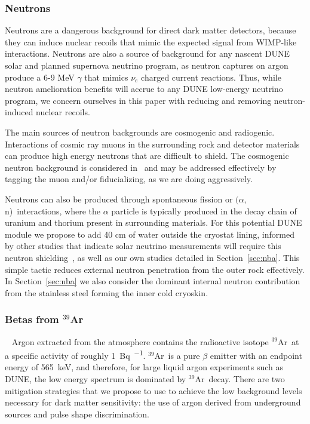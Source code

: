 \documentclass[a4paper,11pt]{article}
\newcommand{\artn}{$^{39}$Ar}
\newcommand{\alphan}{$(\alpha,$ n)}
\begin{document}
\subsubsection{Neutrons}
Neutrons are a dangerous background for direct dark matter detectors, because they can induce nuclear recoils that mimic the expected signal from WIMP-like interactions. Neutrons are also a source of background for any nascent DUNE solar and planned supernova neutrino program, as neutron captures on argon produce a 6-9 MeV $\gamma$ that mimics $\nu_e$ charged current reactions. Thus, while neutron amelioration benefits will accrue to any DUNE low-energy neutrino program, we concern ourselves in this paper with reducing and removing neutron-induced nuclear recoils. 

The main sources of neutron backgrounds are cosmogenic and radiogenic. Interactions of cosmic ray muons in the surrounding rock and detector materials can produce high energy neutrons that are difficult to shield. The cosmogenic neutron background is considered in~\cite{beacom_bkd} and may be addressed effectively by tagging the muon and/or fiducializing, as we are doing aggressively. 

Neutrons can also be produced through spontaneous fission or \alphan ~interactions, where the $\alpha$ particle is typically produced in the decay chain of uranium and thorium present in surrounding materials.  For this potential DUNE module we propose to add 40 cm of water outside the cryostat lining, informed by other studies that indicate solar neutrino measurements will require this neutron shielding~\cite{beacom_snu}, as well as our own studies detailed in Section~\ref{sec:nba}. This simple tactic reduces external neutron penetration from the outer rock effectively. In Section~\ref{sec:nba} we also consider the dominant internal neutron contribution from the stainless steel forming the inner cold cryoskin.  

\subsubsection{Betas from \artn}~\label{argon39}
Argon extracted from the atmosphere contains the radioactive isotope \artn~at a specific activity of roughly \SI{1}{\becquerel\per\kgar}. \artn~is a pure $\beta$ emitter with an endpoint energy of \SI{565}{keV}, and therefore, for large liquid argon experiments such as DUNE, the low energy spectrum is dominated by \artn~decay. There are two mitigation strategies that we propose to use to achieve the low background levels necessary for dark matter sensitivity: the use of argon derived from underground sources and pulse shape discrimination.
\end{document}
